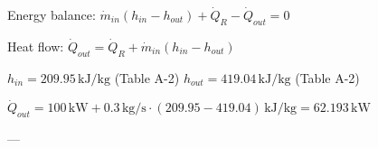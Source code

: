 Energy balance:  
\( \dot{m}_{in} (h_{in} - h_{out}) + \dot{Q}_R - \dot{Q}_{out} = 0 \)  

Heat flow:  
\( \dot{Q}_{out} = \dot{Q}_R + \dot{m}_{in} (h_{in} - h_{out}) \)  

\( h_{in} = 209.95 \, \text{kJ/kg} \) (Table A-2)  
\( h_{out} = 419.04 \, \text{kJ/kg} \) (Table A-2)  

\( \dot{Q}_{out} = 100 \, \text{kW} + 0.3 \, \text{kg/s} \cdot (209.95 - 419.04) \, \text{kJ/kg} = 62.193 \, \text{kW} \)  

---